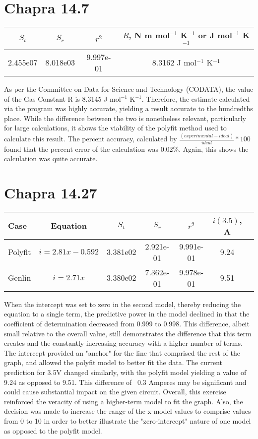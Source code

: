 \documentclass{article}
\begin{document}
\section{Chapra 14.7}
\begin{center}
\begin{tabular}{c|c|c|c}
$S_t$ & $S_r$ & $r^2$ & 
$R$, N m mol$^{-1}$ K$^{-1}$ or J  mol$^{-1}$ K$^{-1}$\\ \hline
2.455e07 & 8.018e03 &  9.997e-01 & 8.3162 J  mol$^{-1}$ K$^{-1}$
\end{tabular}
\end{center}
As per the Committee on Data for Science and Technology (CODATA), the value of the Gas Constant R is 8.3145  J  mol$^{-1}$ K$^{-1}$. Therefore, the estimate calculated via the program was highly accurate, yielding a result accurate to the hundredths place. While the difference between the two is nonetheless relevant, particularly for large calculations, it shows the viability of the polyfit method used to calculate this result. The percent accuracy, calculated by $\frac{(experimental-ideal)}{ideal} * 100$ found that the percent error of the calculation was 0.02\%. Again, this shows the calculation was quite accurate. 

\section{Chapra 14.27}
\begin{center}
\begin{tabular}{l|c|c|c|c|c|c}
Case & Equation & $S_t$ & $S_r$ & $r^2$ & $i(3.5)$, A\\ \hline
Polyfit & $i=2.81x-0.592$ & 3.381e02 & 2.921e-01 & 9.991e-01 &  9.24 \\ 
Genlin & $i=2.71x$ & 3.380e02 & 7.362e-01 & 9.978e-01 & 9.51
\end{tabular}
\end{center}
When the intercept was set to zero in the second model, thereby reducing the equation to a single term, the predictive power in the model declined in that the coefficient of determination decreased from 0.999 to 0.998. This difference, albeit small relative to the overall value, still demonstrates the difference that this term creates and the constantly increasing accuracy with a higher number of terms. The intercept provided an "anchor" for the line that comprised the rest of the graph, and allowed the polyfit model to better fit the data. The current prediction for 3.5V changed similarly, with the polyfit model yielding a value of 9.24 as opposed to 9.51. This difference of ~0.3 Amperes may be significant and could cause substantial impact on the given circuit. Overall, this exercise reinforced the veracity of using a higher-term model to fit the graph. Also, the decision was made to increase the range of the x-model values to comprise values from 0 to 10 in order to better illustrate the "zero-intercept" nature of one model as opposed to the polyfit model.
\pagebreak
\end{document}
